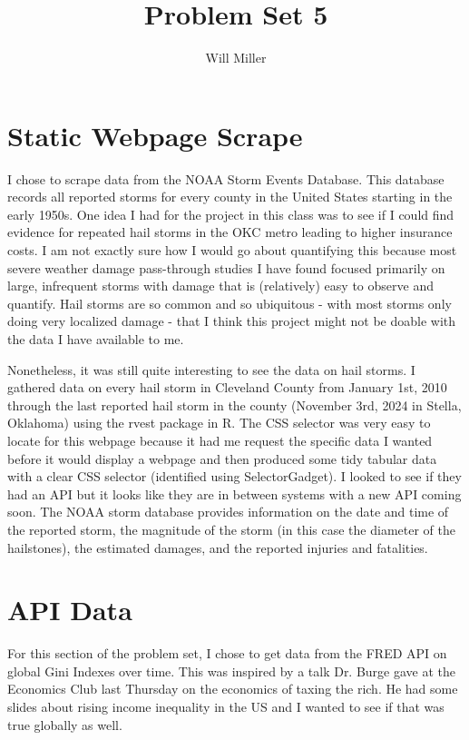 \documentclass{article}
\title{Problem Set 5}
\author{Will Miller}
\begin{document}
\maketitle

\section{Static Webpage Scrape}
I chose to scrape data from the NOAA Storm Events Database. This database records all reported storms for every county in the United States starting in the early 1950s. One idea I had for the project in this class was to see if I could find evidence for repeated hail storms in the OKC metro leading to higher insurance costs. I am not exactly sure how I would go about quantifying this because most severe weather damage pass-through studies I have found focused primarily on large, infrequent storms with damage that is (relatively) easy to observe and quantify. Hail storms are so common and so ubiquitous - with most storms only doing very localized damage - that I think this project might not be doable with the data I have available to me. 

Nonetheless, it was still quite interesting to see the data on hail storms. I gathered data on every hail storm in Cleveland County from January 1st, 2010 through the last reported hail storm in the county (November 3rd, 2024 in Stella, Oklahoma) using the rvest package in R. The CSS selector was very easy to locate for this webpage because it had me request the specific data I wanted before it would display a webpage and then produced some tidy tabular data with a clear CSS selector (identified using SelectorGadget). I looked to see if they had an API but it looks like they are in between systems with a new API coming soon. The NOAA storm database provides information on the date and time of the reported storm, the magnitude of the storm (in this case the diameter of the hailstones), the estimated damages, and the reported injuries and fatalities. 

\section{API Data}
For this section of the problem set, I chose to get data from the FRED API on global Gini Indexes over time. This was inspired by a talk Dr. Burge gave at the Economics Club last Thursday on the economics of taxing the rich. He had some slides about rising income inequality in the US and I wanted to see if that was true globally as well. 
\end{document}

